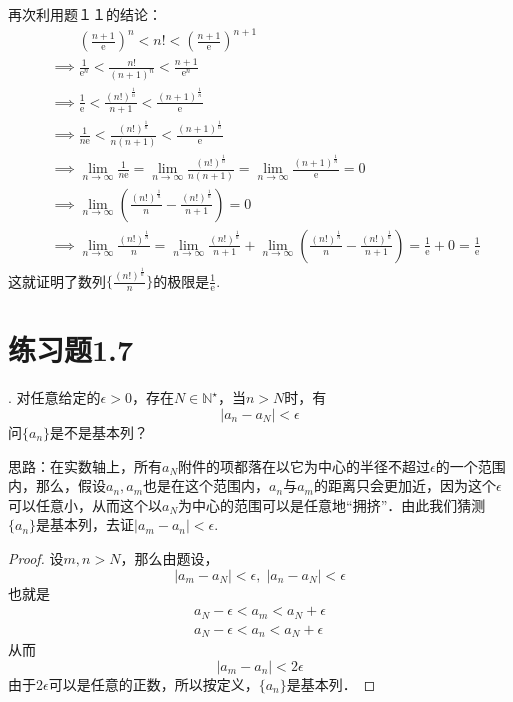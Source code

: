 再次利用题１１的结论：
\begin{align}
    &\phantom{\implies} \left(\frac{n+1}{\mathrm{e}}\right)^n < n! < \left(\frac{n+1}{\mathrm{e}}\right)^{n+1} \\
    &\implies \frac{1}{\mathrm{e}^n} < \frac{n!}{(n+1)^n} < \frac{n+1}{\mathrm{e}^n} \\
    &\implies \frac{1}{\mathrm{e}} < \frac{(n!)^\frac{1}{n}}{n+1} < \frac{(n+1)^\frac{1}{n}}{\mathrm{e}} \\
    &\implies \frac{1}{n \mathrm{e}} < \frac{(n!)^\frac{1}{n}}{n(n+1)} < \frac{(n+1)^\frac{1}{n}}{\mathrm{e}} \\
    &\implies \lim_{n\to\infty} \frac{1}{n \mathrm{e}} = \lim_{n\to\infty} \frac{(n!)^\frac{1}{n}}{n(n+1)} = \lim_{n\to\infty} \frac{(n+1)^\frac{1}{n}}{\mathrm{e}} = 0 \\
    &\implies \lim_{n\to\infty} \left(\frac{(n!)^\frac{1}{n}}{n} - \frac{(n!)^\frac{1}{n}}{n+1}\right) = 0 \\
    &\implies \lim_{n\to\infty} \frac{(n!)^\frac{1}{n}}{n} = \lim_{n\to\infty} \frac{(n!)^\frac{1}{n}}{n+1} + \lim_{n\to\infty} \left(\frac{(n!)^\frac{1}{n}}{n} - \frac{(n!)^\frac{1}{n}}{n+1}\right) = \frac{1}{\mathrm{e}} + 0 = \frac{1}{\mathrm{e}}
\end{align}
这就证明了数列$\displaystyle \{\frac{(n!)^\frac{1}{n}}{n}\}$的极限是$\displaystyle \frac{1}{\mathrm{e}}$.

\section*{练习题1.7}
. 对任意给定的$\epsilon > 0$，存在$N \in \mathbb{N}^\star$，当$n > N$时，有
\begin{equation}
    |a_n - a_N|<\epsilon
\end{equation}
问$\{a_n\}$是不是基本列？

\noindent 思路：在实数轴上，所有$a_N$附件的项都落在以它为中心的半径不超过$\epsilon$的一个范围内，那么，假设$a_n, a_m$也是在这个范围内，$a_n$与$a_m$的距离只会更加近，因为这个$\epsilon$可以任意小，从而这个以$a_N$为中心的范围可以是任意地``拥挤''．由此我们猜测$\{a_n\}$是基本列，去证$|a_m - a_n|<\epsilon$.

\begin{proof}
设$m, n>N$，那么由题设，
\begin{equation}
    |a_m - a_N|<\epsilon, \; |a_n - a_N| <\epsilon
\end{equation}
也就是
\begin{align}
    a_N - \epsilon < a_m < a_N + \epsilon \\
    a_N - \epsilon < a_n < a_N + \epsilon 
\end{align}
从而
\begin{equation}
    |a_m - a_n| < 2\epsilon
\end{equation}
由于$2\epsilon$可以是任意的正数，所以按定义，$\{a_n\}$是基本列．
\end{proof}

